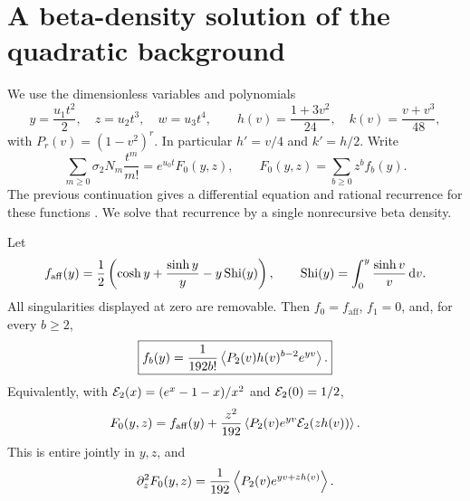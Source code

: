 \section{A beta-density solution of the quadratic background}
\label{sec:quadratic}

We use the dimensionless variables and polynomials
\begin{equation}\label{eq:basic-variables}
 y=\frac{u_1t^2}{2},\quad z=u_2t^3,\quad w=u_3t^4,\qquad
 h(v)=\frac{1+3v^2}{24},\quad k(v)=\frac{v+v^3}{48},
\end{equation}
with $P_r(v)=(1-v^2)^r$. In particular $h'=v/4$ and $k'=h/2$.
Write
\[
 \sum_{m\ge0}\sigma_2N_m\frac{t^m}{m!}
 =e^{u_0t}F_0(y,z),\qquad F_0(y,z)=\sum_{b\ge0}z^bf_b(y).
\]
The previous continuation gives a differential equation and rational
recurrence for these functions \cite{RepoQuadratic}. We solve that
recurrence by a single nonrecursive beta density.

\begin{theorem}\label{thm:quadratic}
Let
\begin{equation}\label{eq:faff}
 f_{\mathrm{aff}}(y)=\frac12\left(
 \cosh y+\frac{\sinh y}{y}-y\operatorname{Shi}(y)\right),
 \qquad \operatorname{Shi}(y)=\int_0^y\frac{\sinh v}{v}\,\mathrm d v.
\end{equation}
All singularities displayed at zero are removable. Then $f_0=f_{\mathrm{aff}}$,
$f_1=0$, and, for every $b\ge2$,
\begin{equation}\label{eq:fb-density}
 \boxed{\displaystyle f_b(y)=\frac1{192b!}
  \left\langle P_2(v)h(v)^{b-2}e^{yv}\right\rangle.}
\end{equation}
Equivalently, with
$\mathcal E_2(x)=(e^x-1-x)/x^2$ and $\mathcal E_2(0)=1/2$,
\begin{equation}\label{eq:F0-compact}
 F_0(y,z)=f_{\mathrm{aff}}(y)+\frac{z^2}{192}
 \left\langle P_2(v)e^{yv}\mathcal E_2(zh(v))\right\rangle.
\end{equation}
This is entire jointly in $y,z$, and
\begin{equation}\label{eq:F0zz}
 \partial_z^2F_0(y,z)=\frac1{192}\left\langle P_2(v)e^{yv+zh(v)}\right\rangle.
\end{equation}
\end{theorem}

